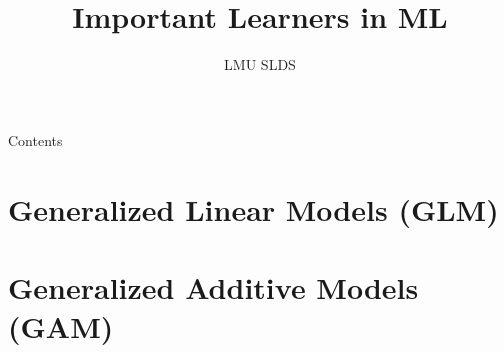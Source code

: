 \documentclass[11pt, t, aspectratio=169]{beamer}
\title{Important Learners in ML}
\institute{\href{https://compstat-lmu.github.io/lecture_i2ml/}{
compstat-lmu.github.io/lecture\_i2ml}}
\author{LMU SLDS}
\date{}
\begin{document}
\lecturechapter{}

\begin{frame}{Contents}
  \tableofcontents
\end{frame}

\footnotesize


%

\section{Generalized Linear Models (GLM)}


% 

\section{Generalized Additive Models (GAM)}


%
%
%
%
%
%
%
%
%
%
%
%
%

\endlecture
\end{document}
